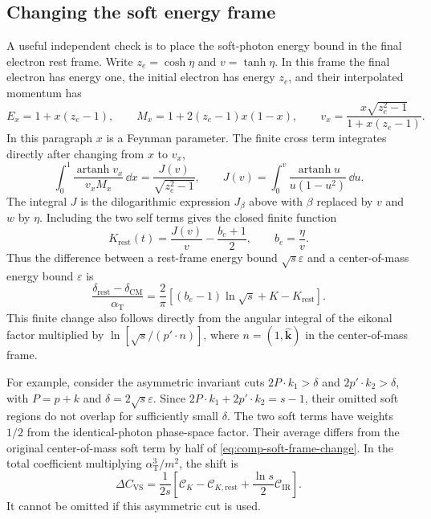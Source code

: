 \subsection{Changing the soft energy frame}
A useful independent check is to place the soft-photon energy bound in
the final electron rest frame. Write $z_e=\cosh\eta$ and
$v=\tanh\eta$. In this frame the final electron has energy one, the
initial electron has energy $z_e$, and their interpolated momentum has
\begin{equation}
 E_x=1+x(z_e-1),\qquad
 M_x=1+2(z_e-1)x(1-x),\qquad
 v_x=\frac{x\sqrt{z_e^2-1}}{1+x(z_e-1)}.
\end{equation}
In this paragraph $x$ is a Feynman parameter. The finite cross term
integrates directly after changing from $x$ to $v_x$,
\begin{equation}
 \int_0^1\frac{\operatorname{artanh}v_x}{v_xM_x}\,\dd x
 =\frac{J(v)}{\sqrt{z_e^2-1}},\qquad
 J(v)=\int_0^v\frac{\operatorname{artanh}u}{u(1-u^2)}\,\dd u.
\end{equation}
The integral $J$ is the dilogarithmic expression $J_\beta$ above with
$\beta$ replaced by $v$ and $w$ by $\eta$. Including the two self terms
gives the closed finite function
\begin{equation}
 K_{\mathrm{rest}}(t)=\frac{J(v)}v-\frac{b_e+1}2,
 \qquad b_e=\frac\eta v.
\end{equation}
Thus the difference between a rest-frame energy bound $\sqrt{s}\varepsilon$
and a center-of-mass energy bound $\varepsilon$ is
\begin{equation}
 \frac{\delta_{\mathrm{rest}}-\delta_{\mathrm{CM}}}{\alpha_{\mathrm T}}
 =\frac2\pi\left[(b_e-1)\ln\sqrt{s}+K-K_{\mathrm{rest}}\right].
 \label{eq:comp-soft-frame-change}
\end{equation}
This finite change also follows directly from the angular integral of
the eikonal factor multiplied by $\ln[\sqrt{s}/(p'\cdot n)]$, where
$n=(1,\widehat{\boldsymbol k})$ in the center-of-mass frame.

For example, consider the asymmetric invariant cuts
$2P\cdot k_1>\delta$ and $2p'\cdot k_2>\delta$, with
$P=p+k$ and $\delta=2\sqrt{s}\varepsilon$.
Since $2P\cdot k_1+2p'\cdot k_2=s-1$, their omitted soft regions do not
overlap for sufficiently small $\delta$. The two soft terms have weights
$1/2$ from the identical-photon phase-space factor. Their average differs
from the original center-of-mass soft term by half of
\eqref{eq:comp-soft-frame-change}. In the total coefficient multiplying
$\alpha_{\mathrm T}^3/m^2$, the shift is
\begin{equation}
 \Delta C_{\mathrm{VS}}=
 \frac1{2s}\left[\mathcal C_K-\mathcal C_{K,\mathrm{rest}}
 +\frac{\ln s}{2}\mathcal C_{\mathrm{IR}}\right].
\end{equation}
It cannot be omitted if this asymmetric cut is used.

